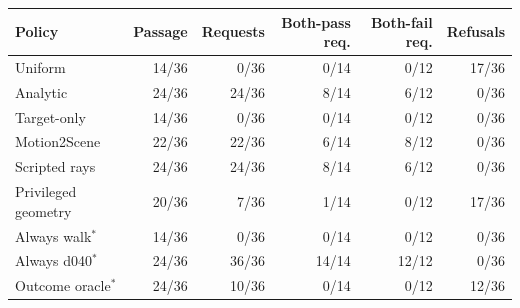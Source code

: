 \begin{tabular}{lrrrrr}
\toprule
Policy & Passage & Requests & Both-pass req. & Both-fail req. & Refusals \\
\midrule
Uniform & 14/36 & 0/36 & 0/14 & 0/12 & 17/36 \\
Analytic & 24/36 & 24/36 & 8/14 & 6/12 & 0/36 \\
Target-only & 14/36 & 0/36 & 0/14 & 0/12 & 0/36 \\
Motion2Scene & 22/36 & 22/36 & 6/14 & 8/12 & 0/36 \\
Scripted rays & 24/36 & 24/36 & 8/14 & 6/12 & 0/36 \\
Privileged geometry & 20/36 & 7/36 & 1/14 & 0/12 & 17/36 \\
Always walk$^{*}$ & 14/36 & 0/36 & 0/14 & 0/12 & 0/36 \\
Always d040$^{*}$ & 24/36 & 36/36 & 14/14 & 12/12 & 0/36 \\
Outcome oracle$^{*}$ & 24/36 & 10/36 & 0/14 & 0/12 & 12/36 \\
\bottomrule
\end{tabular}
